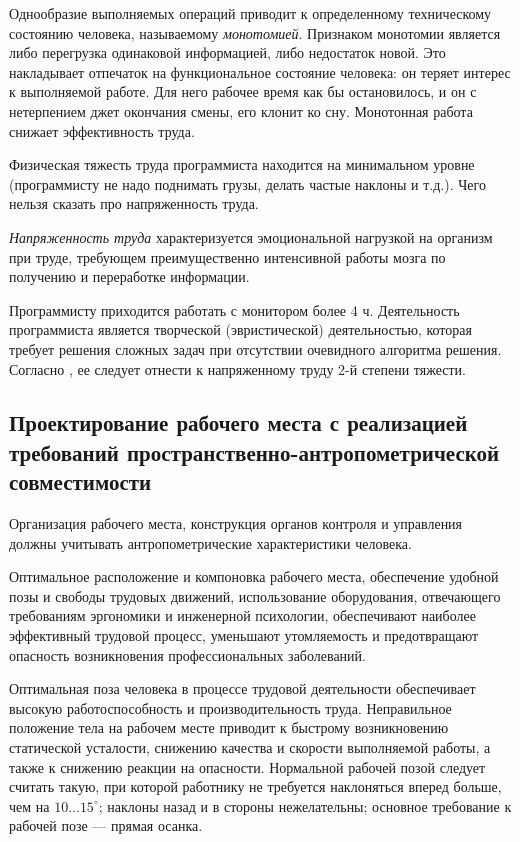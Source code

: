Однообразие выполняемых операций приводит к определенному техническому состоянию человека, называемому \emph{монотомией}. Признаком монотомии является либо перегрузка одинаковой информацией, либо недостаток новой. Это накладывает отпечаток на функциональное состояние человека: он теряет интерес к выполняемой работе. Для него рабочее время как бы остановилось, и он с нетерпением джет окончания смены, его клонит ко сну. Монотонная работа снижает эффективность труда.

Физическая тяжесть труда программиста находится на минимальном уровне (программисту не надо поднимать грузы, делать частые наклоны и т.д.).
Чего нельзя сказать про напряженность труда.

\emph{Напряженность труда} характеризуется эмоциональной нагрузкой на организм при труде, требующем преимущественно интенсивной работы мозга по получению и переработке информации.

Программисту приходится работать с монитором более 4 ч. Деятельность программиста является творческой (эвристической) деятельностью, которая требует решения сложных задач при отсутствии очевидного алгоритма решения. Согласно \cite{belov09}, ее следует отнести к напряженному труду 2-й степени тяжести.

\subsection{Проектирование рабочего места с реализацией требований пространственно\hyp{}антропометрической совместимости}
Организация рабочего места, конструкция органов контроля и управления должны учитывать антропометрические характеристики человека.

Оптимальное расположение и компоновка рабочего места, обеспечение удобной позы и свободы трудовых движений, использование оборудования, отвечающего требованиям эргономики и инженерной психологии, обеспечивают наиболее эффективный трудовой процесс, уменьшают утомляемость и предотвращают опасность возникновения профессиональных заболеваний.

Оптимальная поза человека в процессе трудовой деятельности обеспечивает высокую работоспособность и производительность труда. Неправильное положение тела на рабочем месте приводит к быстрому возникновению статической усталости, снижению качества и скорости выполняемой работы, а также к снижению реакции на опасности. Нормальной рабочей позой следует считать такую, при которой работнику не требуется наклоняться вперед больше, чем на \(10\dots15^{\circ}\); наклоны назад и в стороны нежелательны; основное требование к рабочей позе --- прямая осанка.

